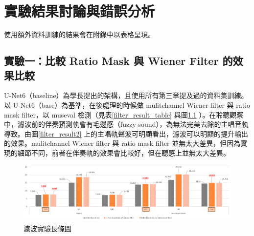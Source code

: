 \chapter{實驗結果討論與錯誤分析}
使用額外資料訓練的結果會在附錄中以表格呈現。

\section{實驗一：比較 Ratio Mask 與 Wiener Filter 的效果比較}
U-Net6（baseline）為學長提出的架構，且使用所有第三章提及過的資料集訓練。以 U-Net6（base）為基準，在後處理的時候做 mulitchannel Wiener filter 與 ratio mask filter，以 museval 檢測（見表\ref{filter_result_table} 與圖\ref{filter_result1} ）。在聆聽觀察中，濾波前的伴奏預測軌會有毛邊感（fuzzy sound），為無法完美去除的主唱音軌導致。由圖\ref{filter_result2} 上的主唱軌聲波可明顯看出，濾波可以明顯的提升輸出的效果。mulitchannel Wiener filter 與 ratio mask filter 並無太大差異，但因為實現的細節不同，前者在伴奏軌的效果會比較好，但在聽感上並無太大差異。

\begin{table}[htbp]
\centering
{}
\caption{實驗數據表}
\label{filter_result_table}
\end{table}

\begin{figure}[htbp]
    \hfil
    \begin{minipage}[t]{1.0\textwidth}
        \includegraphics[width=\textwidth]{./figures/chapter05_result/filter_result1.png}
        \caption {濾波實驗長條圖}
        \label{filter_result1}
    \end{minipage}
    \hfil
\end{figure}

